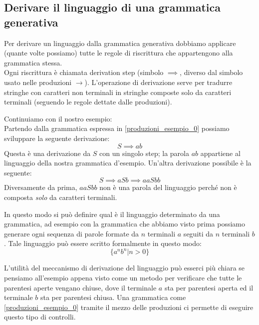 \documentclass[class=book, crop=false, oneside, 12pt]{standalone}
\begin{document}
\subsection{Derivare il linguaggio di una grammatica generativa}
Per derivare un linguaggio dalla grammatica generativa dobbiamo applicare (quante volte possiamo) tutte le regole di riscrittura che appartengono alla grammatica stessa.\\
Ogni riscrittura è chiamata derivation step (simbolo $\implies$, diverso dal simbolo usato nelle produzioni $\to$).
L’operazione di derivazione serve per tradurre stringhe con caratteri non terminali in stringhe composte solo da caratteri terminali (seguendo le regole dettate dalle produzioni).


Continuiamo con il nostro esempio:\\
Partendo dalla grammatica espressa in \ref{produzioni_esempio_0} possiamo sviluppare la seguente derivazione:
\begin{equation}
    S \implies ab
\end{equation}
Questa è una derivazione da $S$ con un singolo step; la parola $ab$ appartiene al linguaggio della nostra grammatica d’esempio.
Un'altra derivazione possibile è la seguente:
\begin{equation}
    S \implies aSb \implies aaSbb
\end{equation}
Diversamente da prima, $aaSbb$ non è una parola del linguaggio perché non è composta \emph{solo} da caratteri terminali.

In questo modo si può definire qual è il linguaggio determinato da una grammatica, ad esempio con la grammatica che abbiamo visto prima possiamo generare ogni sequenza di parole formate da $n$ terminali $a$ seguiti da $n$ terminali $b$.
Tale linguaggio può essere scritto formalmente in questo modo:
\begin{equation}
    \{a^n b^n |n>0\}
\end{equation}


L'utilità del meccanismo di derivazione del linguaggio può esserci più chiara se pensiamo all'esempio appena visto come un metodo per verificare che tutte le parentesi aperte vengano chiuse, dove il terminale $a$ sta per parentesi aperta ed il terminale $b$ sta per parentesi chiusa. Una grammatica come \ref{produzioni_esempio_0} tramite il mezzo delle produzioni ci permette di eseguire questo tipo di controlli.
\end{document}
